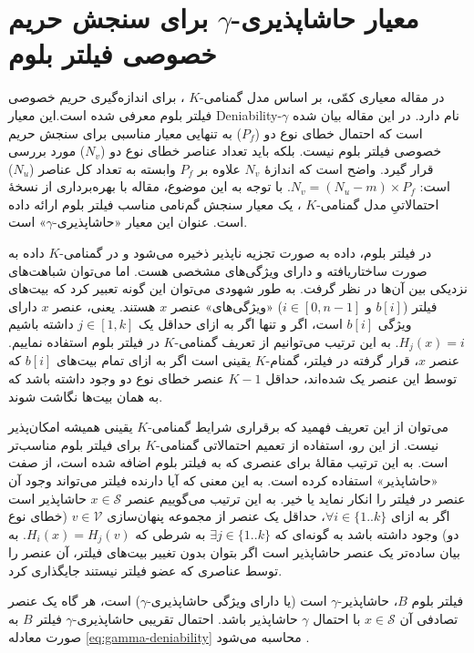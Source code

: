 \section{معیار 
	حاشاپذیری-$\gamma$ برای
	سنجش حریم خصوصی فیلتر بلوم}
\label{gamma-deniability}

در مقاله \cite{Bianchi2012} معیاری کمّی، بر اساس مدل گمنامی-$K$ 
\cite{Sweeney2002}،
برای اندازه‌گیری حریم خصوصی فیلتر بلوم معرفی شده است.این معیار
\gls{Deniability}-$\gamma$
نام دارد. در این مقاله بیان شده است که احتمال خطای نوع دو ($P_f$) به تنهایی معیار مناسبی برای سنجش حریم خصوصی فیلتر بلوم نیست. بلکه باید تعداد عناصر خطای نوع دو ($N_v$) مورد بررسی قرار گیرد. واضح است که اندازهٔ $N_v$ علاوه بر $P_f$ وابسته به تعداد کل عناصر ($N_u$) است:
$N_v=(N_u-m)\times P_f$.
با توجه به این موضوع، مقاله \cite{Bianchi2012} با بهره‌برداری از نسخهٔ احتمالاتیِ مدل گمنامی-$K$
\cite{Lodha2008}،
یک معیار سنجش گم‌نامی مناسب فیلتر بلوم ارائه داده است. عنوان این معیار «حاشاپذیری-$\gamma$» است. 

در فیلتر بلوم، داده به صورت تجزیه ناپذیر ذخیره می‌شود و در گمنامی-$K$ داده به صورت ساختاریافته و دارای ویژگی‌های مشخصی هست. اما می‌توان شباهت‌های نزدیکی بین آن‌ها در نظر گرفت. به طور شهودی می‌توان این گونه تعبیر کرد که بیت‌های فیلتر ($b[i]$ و $i\in[0,n-1]$) «ویژگی‌های» عنصر $x$ هستند. یعنی، عنصر $x$ دارای ویژگی $b[i]$ است، اگر و تنها اگر به ازای حداقل یک 
$j\in[1,k]$ داشته باشیم 
$H_j(x)=i$.
به این ترتیب می‌توانیم از تعریف گمنامی-$K$ در فیلتر بلوم استفاده نماییم. عنصر $x$، قرار گرفته در فیلتر، گمنام-$K$ یقینی است اگر به ازای تمام بیت‌های $b[i]$  که توسط این عنصر یک شده‌اند، حداقل $K-1$ عنصر خطای نوع دو وجود داشته باشد که به همان بیت‌ها نگاشت شوند.

می‌توان از این تعریف فهمید که برقراری شرایط گمنامی-$K$ یقینی همیشه امکان‌پذیر نیست. از این رو، استفاده از تعمیم احتمالاتی گمنامی-$K$ 
\cite{Lodha2008} 
برای فیلتر بلوم مناسب‌تر است. به این ترتیب مقالهٔ \cite{Bianchi2012} برای عنصری که به فیلتر بلوم اضافه شده است، از صفت «حاشاپذیر» استفاده کرده است.  به این معنی که آیا دارنده فیلتر می‌تواند وجود آن عنصر در فیلتر را انکار نماید یا خیر. به این ترتیب می‌گوییم عنصر $x\in \mathcal{S}$ حاشاپذیر است اگر به ازای 
$\forall i \in \{1..k\}$،
حداقل یک عنصر از مجموعه پنهان‌سازی $v\in \mathcal{V}$ (خطای نوع دو) وجود داشته باشد به گونه‌ای که 
$\exists j \in \{1..k\}$
به شرطی که 
$H_i(x) = H_j(v)$.
به بیان ساده‌تر یک عنصر حاشا‌پذیر است اگر بتوان بدون تغییر بیت‌های فیلتر، آن عنصر را توسط عناصری که عضو فیلتر نیستند جایگذاری کرد. 

فیلتر بلوم $B$، حاشاپذیر-$\gamma$ است (یا دارای ویژگی حاشاپذیری-$\gamma$) است، هر گاه یک عنصر تصادفی آن $x\in \mathcal{S}$ با احتمال $\gamma$ حاشاپذیر باشد. احتمال تقریبی حاشاپذیری-$\gamma$ فیلتر $B$ به صورت معادله \eqref{eq:gamma-deniability} محاسبه می‌شود  \cite{Bianchi2012}.

